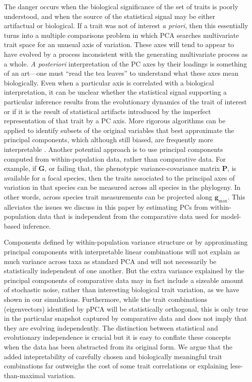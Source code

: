 \documentclass[a4paper,11pt]{article}
\begin{document}
The danger occurs when the biological significance of the set of traits is poorly understood, and when the source of the statistical signal may be either artifactual or biological. If a trait was not of interest \textit{a priori}, then this essentially turns into a multiple comparisons problem in which PCA searches multivariate trait space for an unusual axis of variation. These axes will tend to appear to have evolved by a process inconsistent with the generating multivariate process as a whole. \textit{A posteriori} interpretation of the PC axes by their loadings is something of an art---one must ``read the tea leaves'' to understand what these axes mean biologically. Even when a particular axis is correlated with a biological interpretation, it can be unclear whether the statistical signal supporting a particular inference results from the evolutionary dynamics of the trait of interest or if it is the result of statistical artifacts introduced by the imperfect representation of that trait by a PC axis. More rigorous algorithms can be applied to identify subsets of the original variables that best approximate the principal components, which although still biased, are frequently more interpretable \citep{Cadima2001,Somers1986, Somers1989, Hausman1982, Vines2000, Jolliffe2002, Zou2006}. Another potential approach is to use principal components computed from within-population data, rather than comparative data. For example, if $\mathbf{G}$, or failing that, the phenotypic variance-covariance matrix $\mathbf{P}$, is available for a focal species, then the traits associated to the principal axes of variation in that species can be measured across all species in the phylogeny. In other words, across species trait measurements can be projected along $\mathbf{g}_{\text{max}}$. This alleviates the issues we discuss in this paper by estimating PCs from within-population data that is independent from the comparative data used for model-based inference.  

Components defined by within-population variance structure or by approximating principal components with interpretable linear combinations will not explain as much variance across taxa as standard PCA and will not necessarily be statistically independent of one another. But the extra variance explained by the principal components of comparative data may in fact include a sizeable amount of stochastic noise, rather than interesting biological trait variation, as we have shown in our simulations. Furthermore, while the trait combinations (eigenvectors) identified by pPCA will be statistically orthogonal, this is only true in the particular snapshot captured by comparative data and does not imply that they are evolving independently. The distinction between statistical and evolutionary independence is crucial \citep{HansenHoule2008} but it is easy to conflate these concepts when the data has been abstracted from its original form.  We argue that the added intepretability of carefully chosen and biologically meaningful trait combinations far outweighs the cost of some trait correlations or explaining less-than-maximal variation.
\end{document}
